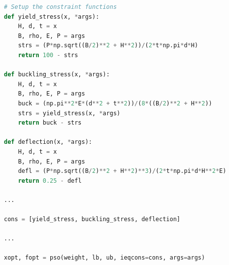\documentclass[12pt]{article}  %
\begin{document}
\begin{subappendices}
\begin{lstlisting}[language=Python, name={my2.py}]
# Setup the constraint functions
def yield_stress(x, *args):
    H, d, t = x
    B, rho, E, P = args
    strs = (P*np.sqrt((B/2)**2 + H**2))/(2*t*np.pi*d*H)
    return 100 - strs

def buckling_stress(x, *args):
    H, d, t = x
    B, rho, E, P = args
    buck = (np.pi**2*E*(d**2 + t**2))/(8*((B/2)**2 + H**2))
    strs = yield_stress(x, *args)
    return buck - strs

def deflection(x, *args):
    H, d, t = x
    B, rho, E, P = args
    defl = (P*np.sqrt((B/2)**2 + H**2)**3)/(2*t*np.pi*d*H**2*E)
    return 0.25 - defl

...

cons = [yield_stress, buckling_stress, deflection]

...

xopt, fopt = pso(weight, lb, ub, ieqcons=cons, args=args)



\end{lstlisting}


\end{subappendices}  %
\end{document}

